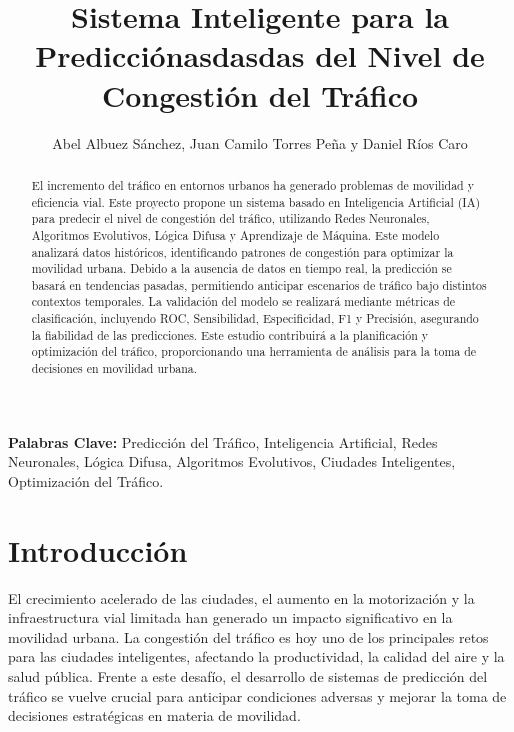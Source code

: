 \documentclass{svproc} %
\begin{document}
\title{Sistema Inteligente para la Predicciónasdasdas del Nivel de Congestión del Tráfico}
\author{Abel Albuez Sánchez, Juan Camilo Torres Peña y Daniel Ríos Caro}

\maketitle

\begin{abstract}
El incremento del tráfico en entornos urbanos ha generado problemas
de movilidad y eficiencia vial. Este proyecto propone un sistema basado en Inteligencia Artificial (IA) 
para predecir el nivel de congestión del tráfico, utilizando Redes Neuronales, Algoritmos Evolutivos, 
Lógica Difusa y Aprendizaje de Máquina. Este modelo analizará datos históricos, identificando patrones de congestión 
para optimizar la movilidad urbana. Debido a la ausencia de datos en tiempo real, 
la predicción se basará en tendencias pasadas, permitiendo anticipar escenarios de tráfico
 bajo distintos contextos temporales. La validación del modelo se realizará mediante métricas de clasificación, incluyendo ROC,
  Sensibilidad, Especificidad, F1 y Precisión, asegurando la fiabilidad de las predicciones.
   Este estudio contribuirá a la planificación y optimización del tráfico, proporcionando una herramienta de análisis para la toma de decisiones en movilidad urbana.
\end{abstract}

\noindent\textbf{Palabras Clave:} Predicción del Tráfico, Inteligencia Artificial, Redes Neuronales, Lógica Difusa, Algoritmos Evolutivos, Ciudades Inteligentes, Optimización del Tráfico.

\section{Introducción}

El crecimiento acelerado de las ciudades, el aumento en la motorización y la infraestructura vial limitada han generado un impacto significativo en la movilidad urbana. La congestión del tráfico es hoy uno de los principales retos para las ciudades inteligentes, afectando la productividad, la calidad del aire y la salud pública. Frente a este desafío, el desarrollo de sistemas de predicción del tráfico se vuelve crucial para anticipar condiciones adversas y mejorar la toma de decisiones estratégicas en materia de movilidad.
\end{document}
